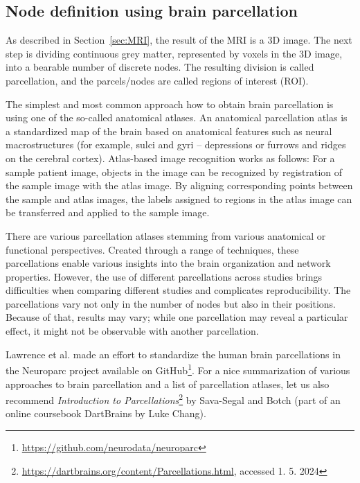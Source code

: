 \subsection{Node definition using brain parcellation}

As described in Section~\ref{sec:MRI}, the result of the MRI is a 3D image. The next step is dividing continuous grey matter, represented by voxels in the 3D image, into a bearable number of discrete nodes. The resulting division is called parcellation, and the parcels/nodes are called regions of interest (ROI). 

The simplest and most common approach how to obtain brain parcellation is using one of the so-called anatomical atlases. An anatomical parcellation atlas is a standardized map of the brain based on anatomical features such as neural macrostructures (for example, sulci and gyri -- depressions or furrows and ridges on the cerebral cortex). Atlas-based image recognition works as follows: For a sample patient image, objects in the image can be recognized by registration of the sample image with the atlas image. By aligning corresponding points between the sample and atlas images, the labels assigned to regions in the atlas image can be transferred and applied to the sample image. \cite{sotiropoulos_building_2019, lawrence_standardizing_2021,chang_ljchangdartbrains_2020,rohrer_focused_2008} 

There are various parcellation atlases stemming from various anatomical or functional perspectives. Created through a range of techniques, these parcellations enable various insights into the brain organization and network properties. However, the use of different parcellations across studies brings difficulties when comparing different studies and complicates reproducibility. The parcellations vary not only in the number of nodes but also in their positions. Because of that, results may vary; while one parcellation may reveal a particular effect, it might not be observable with another parcellation.  \cite{sotiropoulos_building_2019, lawrence_standardizing_2021}

Lawrence et al. made an effort to standardize the human brain parcellations in the Neuroparc project available on GitHub\footnote{\url{https://github.com/neurodata/neuroparc}}. For a nice summarization of various approaches to brain parcellation and a list of parcellation atlases, let us also recommend \textit{Introduction to Parcellations}\footnote{\url{https://dartbrains.org/content/Parcellations.html}, accessed 1. 5. 2024} by Sava-Segal and Botch (part of an online coursebook DartBrains by Luke Chang). \cite{chang_ljchangdartbrains_2020}

